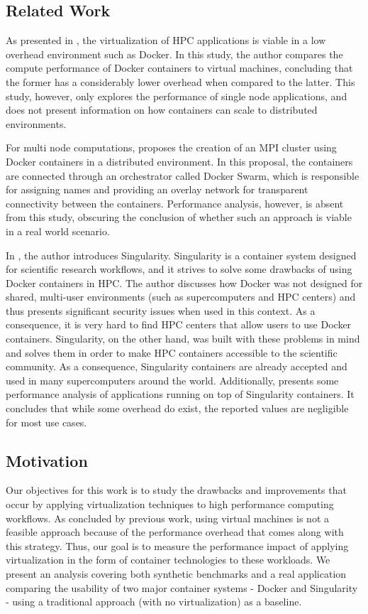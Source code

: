 \documentclass[12pt]{article}
\begin{document}
\subsection{Related Work}
\label{sec:orgc90be45}
As presented in \cite{7562612}, the virtualization of HPC applications is viable in a low overhead environment such as Docker. In this study, the author compares the compute performance of Docker containers to virtual machines, concluding that the former has a considerably lower overhead when compared to the latter. This study, however, only explores the performance of single node applications, and does not present information on how containers can scale to distributed environments.

For multi node computations, \cite{7868429} proposes the creation of an MPI cluster using Docker containers in a distributed environment. In this proposal, the containers are connected through an orchestrator called Docker Swarm, which is responsible for assigning names and providing an overlay network for transparent connectivity between the containers. Performance analysis, however, is absent from this study, obscuring the conclusion of whether such an approach is viable in a real world scenario.

In \cite{10.1371/journal.pone.0177459}, the author introduces Singularity. Singularity is a container system designed for scientific research workflows, and it strives to solve some drawbacks of using Docker containers in HPC. The author discusses how Docker was not designed for shared, multi-user environments (such as supercomputers and HPC centers) and thus presents significant security issues when used in this context. As a consequence, it is very hard to find HPC centers that allow users to use Docker containers. Singularity, on the other hand, was built with these problems in mind and solves them in order to make HPC containers accessible to the scientific community. As a consequence, Singularity containers are already accepted and used in many supercomputers around the world. Additionally, \cite{Le:2017:PAA:3093338.3106737} presents some performance analysis of applications running on top of Singularity containers. It concludes that while some overhead do exist, the reported values are negligible for most use cases. 

\subsection{Motivation}
\label{sec:orgb63aa58}
Our objectives for this work is to study the drawbacks and improvements that occur by applying virtualization techniques to high performance computing workflows. As concluded by previous work, using virtual machines is not a feasible approach because of the performance overhead that comes along with this strategy. Thus, our goal is to measure the performance impact of applying virtualization in the form of container technologies to these workloads. We present an analysis covering both synthetic benchmarks and a real application comparing the usability of two major container systems - Docker and Singularity - using a traditional approach (with no virtualization) as a baseline.
\end{document}
